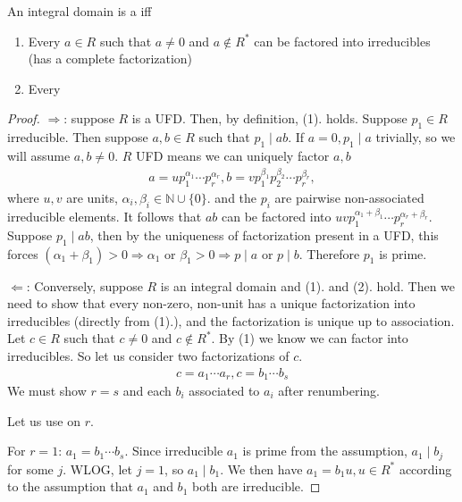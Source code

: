 \documentclass{article}
\begin{document}
\begin{thma}\label{thm:indsad}An integral domain is a  iff
\begin{enumerate}[(1).]
    \item Every $a \in R$ such that $a \neq 0$ and $a \notin R^{*}$ can be factored into irreducibles (has a complete factorization)
    \item Every 
\end{enumerate}
\end{thma} 

\begin{proof}
$\Rightarrow$: suppose $R$ is a UFD. Then, by definition, (1). holds. Suppose $p_{1} \in R$ irreducible. Then suppose $a, b \in R$ such that $p_{1} \mid a b$. If $a=0, p_{1} \mid a$ trivially, so we will assume $a, b \neq 0$. $R$ UFD means we can uniquely factor $a, b$
\begin{align*}
a=u p_{1}^{\alpha_{1}} \cdots p_{r}^{\alpha_{r}}, b=v p_{1}^{\beta_{1}} p_{2}^{\beta_{2}} \cdots p_{r}^{\beta_{r}},
\end{align*}
where $u, v$ are units, $\alpha_{i}, \beta_{i} \in \mathbb{N} \cup\{0\}$. and the $p_{i}$ are pairwise non-associated irreducible elements. It follows that $a b$ can be factored into $u v p_{1}^{\alpha_{1}+\beta_{1}} \cdots p_{r}^{\alpha_{r}+\beta_{r}}$. Suppose $p_{1} \mid a b$, then by the uniqueness of factorization present in a UFD, this forces $\left(\alpha_{1}+\beta_{1}\right)>0 \Rightarrow \alpha_{1}$ or $\beta_{1}>0 \Rightarrow p \mid a$ or $p \mid b$. Therefore $p_{1}$ is prime.

$\Leftarrow$: Conversely, suppose $R$ is an integral domain and (1). and (2). hold. Then we need to show that every non-zero, non-unit has a unique factorization into irreducibles (directly from (1).), and the factorization is unique up to association. Let $c \in R$ such that $c \neq 0$ and $c \notin R^{*}$. By (1) we know we can factor into irreducibles. So let us consider two factorizations of $c$. 
\begin{align*}
c=a_{1} \cdots a_{r}, c=b_{1} \cdots b_{s}
\end{align*}
We must show $r=s$ and each $b_{i}$ associated to $a_{i}$ after renumbering. 

Let us use  on $r$.

For $r=1$: $a_{1}=b_{1} \cdots b_{s}$. Since irreducible $a_1$ is prime from the assumption, $a_1\mid b_j$ for some $j$. WLOG, let $j=1$, so $a_1\mid b_1$.  We then have $a_{1}=b_{1} u, u \in R^{*}$ according to the assumption that $a_1$ and $b_1$  both are irreducible.


\end{proof}
\end{document}
